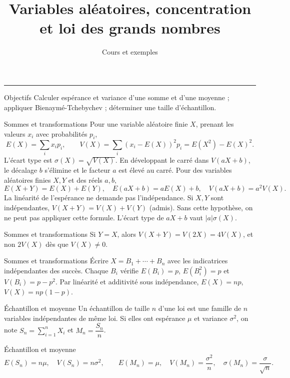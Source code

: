 \documentclass[aspectratio=169,10pt]{beamer}
\title{Variables aléatoires, concentration et loi des grands nombres}
\subtitle{Cours et exemples}
\date{}
\author{}
\begin{document}
\begin{frame}[plain]
\vfill
{\inserttitle\par}
\medskip
{\insertsubtitle\par}
\medskip
{\rule{\textwidth}{.5pt}}
\vfill
\end{frame}
\begin{frame}{Objectifs}
Calculer espérance et variance d'une somme et d'une moyenne ; appliquer Bienaymé-Tchebychev ; déterminer une taille d'échantillon.
\end{frame}
\begin{frame}{Sommes et transformations}
Pour une variable aléatoire finie \(X\), prenant les valeurs \(x_i\) avec probabilités \(p_i\),
\[E(X)=\sum_i x_ip_i,\qquad V(X)=\sum_i(x_i-E(X))^2p_i=E(X^2)-E(X)^2.\]
L'écart type est \(\sigma(X)=\sqrt{V(X)}\). En développant le carré dans \(V(aX+b)\), le décalage \(b\) s'élimine et le facteur \(a\) est élevé au carré.
Pour des variables aléatoires finies \(X,Y\) et des réels \(a,b\),
\[E(X+Y)=E(X)+E(Y),\quad E(aX+b)=aE(X)+b,\quad V(aX+b)=a^2V(X).\]
La linéarité de l'espérance ne demande pas l'indépendance. Si \(X,Y\) sont indépendantes, \(V(X+Y)=V(X)+V(Y)\) (admis). Sans cette hypothèse, on ne peut pas appliquer cette formule. L'écart type de \(aX+b\) vaut \(|a|\sigma(X)\).
\end{frame}
\begin{frame}{Sommes et transformations}
Si \(Y=X\), alors \(V(X+Y)=V(2X)=4V(X)\), et non \(2V(X)\) dès que \(V(X)\ne0\).
\end{frame}
\begin{frame}{Sommes et transformations}
Écrire \(X=B_1+\cdots+B_n\) avec les indicatrices indépendantes des succès. Chaque \(B_i\) vérifie \(E(B_i)=p\), \(E(B_i^2)=p\) et \(V(B_i)=p-p^2\). Par linéarité et additivité sous indépendance, \(E(X)=np\), \(V(X)=np(1-p)\).
\end{frame}
\begin{frame}{Échantillon et moyenne}
Un échantillon de taille \(n\) d'une loi est une famille de \(n\) variables indépendantes de même loi. Si elles ont espérance \(\mu\) et variance \(\sigma^2\), on note \(S_n=\sum_{i=1}^nX_i\) et \(M_n=\dfrac{S_n}{n}\).
\end{frame}
\begin{frame}{Échantillon et moyenne}
\[E(S_n)=n\mu,\quad V(S_n)=n\sigma^2,\qquad E(M_n)=\mu,\quad V(M_n)=\dfrac{\sigma^2}{n},\quad\sigma(M_n)=\dfrac\sigma{\sqrt n}.\]
\end{frame}
\end{document}

